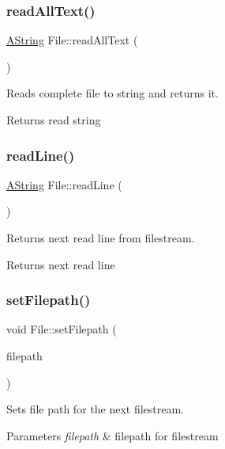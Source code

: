 \subsubsection{\texorpdfstring{readAllText()}{readAllText()}}
{\footnotesize\ttfamily \mbox{\hyperlink{class_a_string}{A\+String}} File\+::read\+All\+Text (\begin{DoxyParamCaption}{ }\end{DoxyParamCaption})}



Reads complete file to string and returns it. 

\begin{DoxyReturn}{Returns}
read string 
\end{DoxyReturn}
\mbox{\label{class_file_ad65ed49713d0b0e11a439cb3bc148171}} 
\subsubsection{\texorpdfstring{readLine()}{readLine()}}
{\footnotesize\ttfamily \mbox{\hyperlink{class_a_string}{A\+String}} File\+::read\+Line (\begin{DoxyParamCaption}{ }\end{DoxyParamCaption})}



Returns next read line from filestream. 

\begin{DoxyReturn}{Returns}
next read line 
\end{DoxyReturn}
\mbox{\label{class_file_ae5b50c42cb117914a87347461b4bfb56}} 
\subsubsection{\texorpdfstring{setFilepath()}{setFilepath()}}
{\footnotesize\ttfamily void File\+::set\+Filepath (\begin{DoxyParamCaption}\item[{const \mbox{\hyperlink{class_a_string}{A\+String}} \&}]{filepath }\end{DoxyParamCaption})}



Sets file path for the next filestream. 


\begin{DoxyParams}{Parameters}
{\em filepath} & filepath for filestream \\
\hline
\end{DoxyParams}
\mbox{\label{class_file_a7fd6b7ead40f02ea7e578e281465bf80}} 
